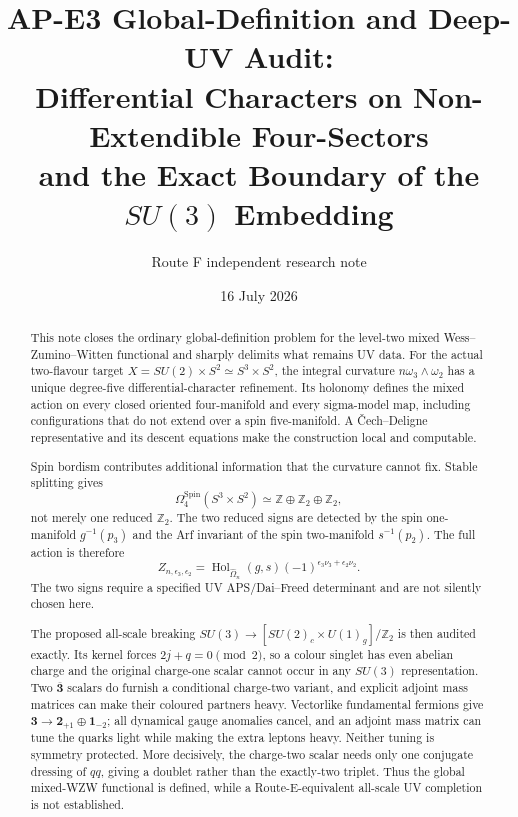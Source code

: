 \documentclass[11pt]{article}
\title{AP-E3 Global-Definition and Deep-UV Audit:\\
Differential Characters on Non-Extendible Four-Sectors\\
and the Exact Boundary of the \(SU(3)\) Embedding}
\author{Route F independent research note}
\date{16 July 2026}
\theoremstyle{definition}
\theoremstyle{remark}
\newcommand{\ZZ}{\mathbb Z}
\newcommand{\Hol}{\operatorname{Hol}}
\begin{document}
\maketitle

\begin{abstract}
This note closes the ordinary global-definition problem for the level-two
mixed Wess--Zumino--Witten functional and sharply delimits what remains UV
data.  For the actual two-flavour target
\(X=SU(2)\times S^2\simeq S^3\times S^2\), the integral curvature
\(n\omega_3\wedge\omega_2\) has a unique degree-five differential-character
refinement.  Its holonomy defines the mixed action on every closed oriented
four-manifold and every sigma-model map, including configurations that do not
extend over a spin five-manifold.  A \v{C}ech--Deligne representative and its
descent equations make the construction local and computable.

Spin bordism contributes additional information that the curvature cannot
fix.  Stable splitting gives
\[
 \Omega^{\mathrm{Spin}}_4(S^3\times S^2)
 \simeq \ZZ\oplus\ZZ_2\oplus\ZZ_2,
\]
not merely one reduced \(\ZZ_2\).  The two reduced signs are detected by the
spin one-manifold \(g^{-1}(p_3)\) and the Arf invariant of the spin
two-manifold \(s^{-1}(p_2)\).  The full action is therefore
\[
 Z_{n,\epsilon_3,\epsilon_2}
 =\Hol_{\widehat\Omega_n}(g,s)
 (-1)^{\epsilon_3\nu_3+\epsilon_2\nu_2}.
\]
The two signs require a specified UV APS/Dai--Freed determinant and are not
silently chosen here.

The proposed all-scale breaking
\(SU(3)\to[SU(2)_c\times U(1)_g]/\ZZ_2\) is then audited exactly.  Its kernel
forces \(2j+q=0\pmod2\), so a colour singlet has even abelian charge and the
original charge-one scalar cannot occur in any \(SU(3)\) representation.
Two \(\overline{\bm3}\) scalars do furnish a conditional charge-two variant,
and explicit adjoint mass matrices can make their coloured partners heavy.
Vectorlike fundamental fermions give
\(\bm3\to\bm2_{+1}\oplus\bm1_{-2}\); all dynamical gauge anomalies cancel,
and an adjoint mass matrix can tune the quarks light while making the extra
leptons heavy.  Neither tuning is symmetry protected.  More decisively, the
charge-two scalar needs only one conjugate dressing of \(qq\), giving a
doublet rather than the exactly-two triplet.  Thus the global mixed-WZW
functional is defined, while a Route-E-equivalent all-scale UV completion is
not established.
\end{abstract}

\tableofcontents
\end{document}
